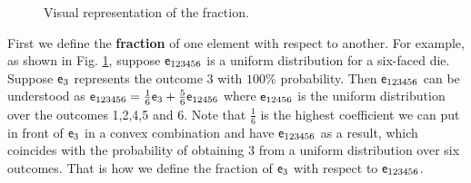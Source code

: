 \begin{figure}[h]
	\centering
	\def\xstep{0.75em}
	\def\bHeight{0.6}
	\def\tHeight{0.1}
	\def\tGap{0.3}
	\caption{Visual representation of the fraction.}\label{pm-es-fig-fraction}
\end{figure}

First we define the \textbf{fraction} of one element with respect to another. For example, as shown in Fig. \ref{pm-es-fig-fraction}, suppose $\mathsf{e}_{123456}$ is a uniform distribution for a six-faced die. Suppose $\mathsf{e}_3$ represents the outcome 3 with $100\%$ probability. Then $\mathsf{e}_{123456}$ can be understood as $\mathsf{e}_{123456} = \frac{1}{6} \mathsf{e}_3 + \frac{5}{6} \mathsf{e}_{12456}$ where $\mathsf{e}_{12456}$ is the uniform distribution over the outcomes 1,2,4,5 and 6. Note that $\frac{1}{6}$ is the highest coefficient we can put in front of $\mathsf{e}_3$ in a convex combination and have $\mathsf{e}_{123456}$ as a result, which coincides with the probability of obtaining 3 from a uniform distribution over six outcomes. That is how we define the fraction of $\mathsf{e}_3$ with respect to $\mathsf{e}_{123456}$.

